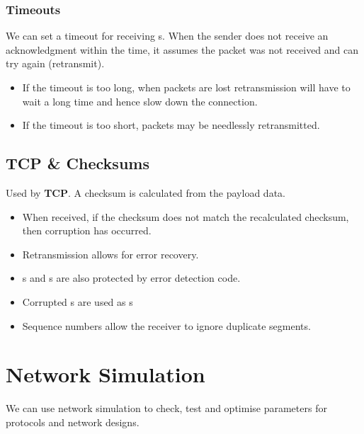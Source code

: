 \subsubsection{Timeouts}
We can set a timeout for receiving s. When the sender does not receive an acknowledgment within the time, it assumes the packet was not received and can try again (retransmit).
\begin{itemize}
    \setlength\itemsep{0em}
    \item If the timeout is too long, when packets are lost retransmission will have to wait a long time and hence slow down the connection.
    \item If the timeout is too short, packets may be needlessly retransmitted.
\end{itemize}
\subsection{TCP \& Checksums}
Used by \textbf{TCP}. A checksum is calculated from the payload data.
\begin{itemize}
    \setlength\itemsep{0em}
    \item When received, if the checksum does not match the recalculated checksum, then corruption has occurred.
    \item Retransmission allows for error recovery.
    \item {}s and s are also protected by error detection code.
    \item Corrupted s are used as s
    \item Sequence numbers allow the receiver to ignore duplicate segments.
\end{itemize}

\section{Network Simulation}
We can use network simulation to check, test and optimise parameters for protocols and network designs.
\begin{itemize}
    \setlength\itemsep{0em}
\end{itemize}

